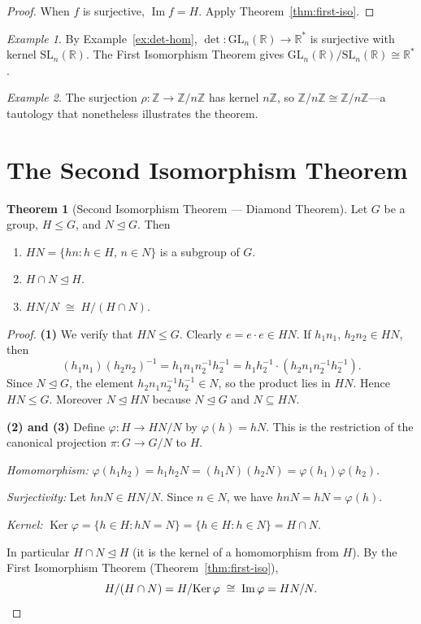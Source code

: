 \documentclass[12pt,a4paper,openany]{book}
\theoremstyle{definition}
\newtheorem{theorem}{Theorem}[chapter]
\theoremstyle{remark}
\newtheorem{example}{Example}[chapter]
\newcommand{\Z}{\mathbb{Z}}
\newcommand{\R}{\mathbb{R}}
\DeclareMathOperator{\Ker}{Ker}
\DeclareMathOperator{\im}{Im}
\begin{document}
\begin{proof}
When $f$ is surjective, $\im f=H$.  Apply Theorem~\ref{thm:first-iso}.
\end{proof}

\begin{example}\label{ex:first-iso-det}
By Example~\ref{ex:det-hom}, $\det\colon\mathrm{GL}_n(\R)\to\R^*$
is surjective with kernel $\mathrm{SL}_n(\R)$.  The First Isomorphism
Theorem gives
$\mathrm{GL}_n(\R)/\mathrm{SL}_n(\R)\cong\R^*$.
\end{example}

\begin{example}\label{ex:first-iso-Zn}
The surjection $\rho\colon\Z\to\Z/n\Z$ has kernel $n\Z$, so
$\Z/n\Z\cong\Z/n\Z$—a tautology that nonetheless illustrates the
theorem.
\end{example}

\section{The Second Isomorphism Theorem}\label{sec:second-iso}

\begin{theorem}[Second Isomorphism Theorem — Diamond Theorem]\label{thm:second-iso}
Let $G$ be a group, $H\le G$, and $N\trianglelefteq G$.  Then
\begin{enumerate}
\item $HN = \{hn : h\in H,\, n\in N\}$ is a subgroup of $G$.
\item $H\cap N\trianglelefteq H$.
\item $HN/N \;\cong\; H/(H\cap N)$.
\end{enumerate}
\end{theorem}

\begin{proof}
\textbf{(1)}  We verify that $HN\le G$.  Clearly $e=e\cdot e\in HN$.
If $h_1 n_1,\, h_2 n_2\in HN$, then
\[
   (h_1 n_1)(h_2 n_2)^{-1} = h_1 n_1 n_2^{-1} h_2^{-1}
   = h_1 h_2^{-1}\cdot (h_2 n_1 n_2^{-1} h_2^{-1}).
\]
Since $N\trianglelefteq G$, the element $h_2 n_1 n_2^{-1} h_2^{-1}\in N$,
so the product lies in $HN$.  Hence $HN\le G$.
Moreover $N\trianglelefteq HN$ because $N\trianglelefteq G$ and
$N\subseteq HN$.

\textbf{(2) and (3)}  Define $\varphi\colon H\to HN/N$ by
$\varphi(h)=hN$.  This is the restriction of the canonical projection
$\pi\colon G\to G/N$ to $H$.

\emph{Homomorphism:}  $\varphi(h_1 h_2)=h_1 h_2 N = (h_1 N)(h_2 N)
=\varphi(h_1)\varphi(h_2)$.

\emph{Surjectivity:}  Let $hnN\in HN/N$.  Since $n\in N$, we have
$hnN=hN=\varphi(h)$.

\emph{Kernel:}
$\Ker\varphi = \{h\in H : hN=N\} = \{h\in H : h\in N\} = H\cap N$.

In particular $H\cap N\trianglelefteq H$ (it is the kernel of a
homomorphism from $H$).  By the First Isomorphism Theorem
(Theorem~\ref{thm:first-iso}),
\[
   H/(H\cap N) = H/\!\Ker\varphi \;\cong\; \im\varphi = HN/N. \qedhere
\]
\end{proof}
\end{document}
